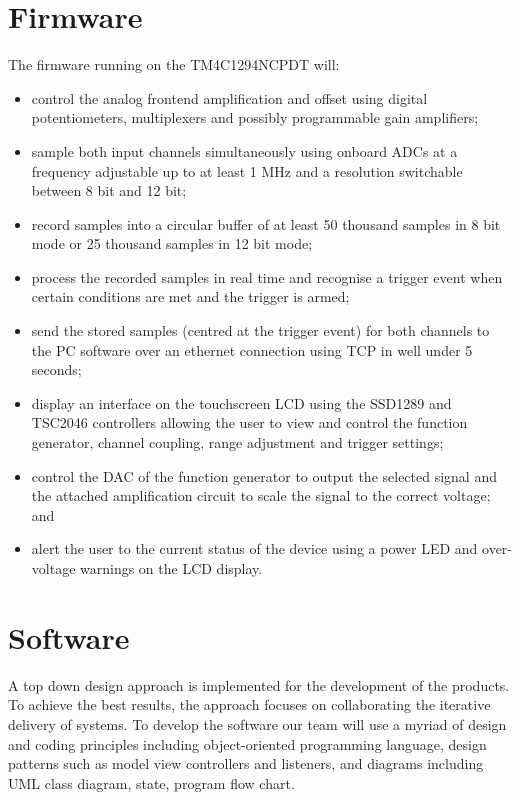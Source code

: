 \documentclass[12pt]{report}
\begin{document}
\section{Firmware}
The firmware running on the TM4C1294NCPDT will:
\begin{itemize}
	\item control the analog frontend amplification and offset using digital potentiometers, multiplexers and possibly programmable gain amplifiers;
	\item sample both input channels simultaneously using onboard ADCs at a frequency adjustable up to at least 1 MHz and a resolution switchable between 8 bit and 12 bit;
	\item record samples into a circular buffer of at least 50 thousand samples in 8 bit mode or 25 thousand samples in 12 bit mode;
	\item process the recorded samples in real time and recognise a trigger event when certain conditions are met and the trigger is armed;
	\item send the stored samples (centred at the trigger event) for both channels to the PC software over an ethernet connection using TCP in well under 5 seconds;
	\item display an interface on the touchscreen LCD using the SSD1289 and TSC2046 controllers allowing the user to view and control the function generator, channel coupling, range adjustment and trigger settings;
	\item control the DAC of the function generator to output the selected signal and the attached amplification circuit to scale the signal to the correct voltage; and
	\item alert the user to the current status of the device using a power LED and over-voltage warnings on the LCD display.
\end{itemize}

\section{Software}
A top down design approach is implemented for the development of the products. To achieve the best results, the approach focuses on collaborating the iterative delivery of systems. To develop the software our team will use a myriad of design and coding principles including object-oriented programming language, design patterns such as model view controllers and listeners, and diagrams including UML class diagram, state, program flow chart.
\end{document}
